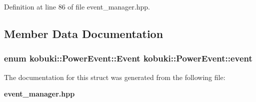 \-Definition at line 86 of file event\-\_\-manager.\-hpp.



\subsection{\-Member \-Data \-Documentation}
\subsubsection[{event}]{\setlength{\rightskip}{0pt plus 5cm}enum {\bf kobuki\-::\-Power\-Event\-::\-Event}  {\bf kobuki\-::\-Power\-Event\-::event}}\label{structkobuki_1_1PowerEvent_a69cd47f8f7316e75a4c55dfea2e34d29}


\-The documentation for this struct was generated from the following file\-:\begin{DoxyCompactItemize}
\item 
{\bf event\-\_\-manager.\-hpp}\end{DoxyCompactItemize}
